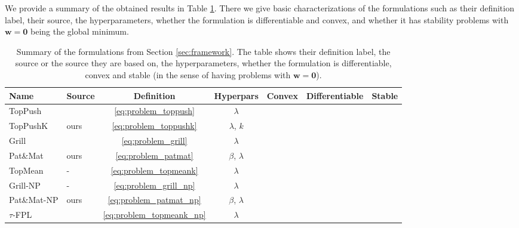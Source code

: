 \documentclass[]{interact}
\theoremstyle{plain}%
\theoremstyle{definition}
\theoremstyle{remark}
\newcommand{\cmark}{{\color{mygreen} \ding{51}}}%
\newcommand{\xmark}{{\color{myred} \ding{55}}}
\newcommand{\atoppush}{TopPush\xspace}
\newcommand{\atoppushk}{TopPushK\xspace}
\newcommand{\agrill}{Grill\xspace}
\newcommand{\apatmat}{Pat\&Mat\xspace}
\newcommand{\atopmeank}{TopMean\xspace}
\newcommand{\anpA}{Grill-NP\xspace}
\newcommand{\anpB}{Pat\&Mat-NP\xspace}
\newcommand{\anpC}{$\tau$-FPL\xspace}
\begin{document}
We provide a summary of the obtained results in Table \ref{tab:methods}. There we give basic characterizations of the formulations such as their definition label, their source, the hyperparameters, whether the formulation is differentiable and convex, and whether it has stability problems with $\bm w=\bm 0$ being the global minimum. 

\begin{table}[!ht]
\caption{Summary of the formulations from Section \ref{sec:framework}. The table shows their definition label, the source or the source they are based on, the hyperparameters, whether the formulation is differentiable, convex and stable (in the sense of having problems with $\bm w=\bm 0$).}
\label{tab:methods}
\centering
\begin{tabular}{>{\kern-0.5\tabcolsep}ll ccccc<{\kern-0.5\tabcolsep}}\toprule
Name & Source & Definition & Hyperpars & Convex & Differentiable & Stable \\
\midrule
 \atoppush & \cite{Li_TopPush} & \eqref{eq:problem_toppush}& $\lambda$ & \cmark & \xmark & \xmark\\
\atoppushk & ours & \eqref{eq:problem_toppushk} & $\lambda$, $k$ & \cmark & \xmark & \xmark\\ 
 \agrill & \cite{Grill_2016} & \eqref{eq:problem_grill}  & $\lambda$ & \xmark & \xmark & \cmark\\
\apatmat & ours & \eqref{eq:problem_patmat} & $\beta$, $\lambda$ & \cmark & \cmark & \cmark\\ 
 \atopmeank & - & \eqref{eq:problem_topmeank} & $\lambda$ & \cmark & \xmark & \xmark\\ 
\anpA & - & \eqref{eq:problem_grill_np} & $\lambda$ & \xmark & \xmark & \cmark\\
 \anpB & ours & \eqref{eq:problem_patmat_np} & $\beta$, $\lambda$ & \cmark & \cmark & \cmark\\
\anpC & \cite{zhang2018tau} & \eqref{eq:problem_topmeank_np} & $\lambda$ & \cmark & \xmark & \xmark\\
\bottomrule
\end{tabular}
\end{table}
\end{document}
